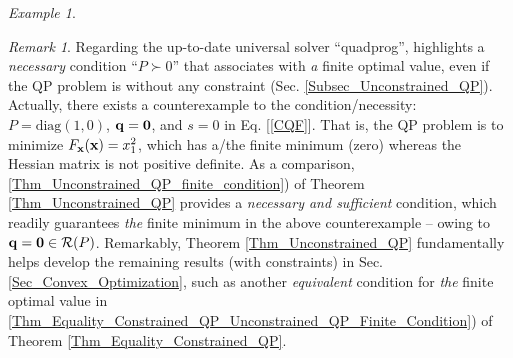 \documentclass[9pt,twocolumn,twoside,lineno]{pnas-new-1}
\newcommand{\bfx}{{\bf x}}
\newcommand{\bfq}{{\bf q}}
\newcommand{\bfzero}{{\bf 0}}
\newcommand{\calR}{{\mathcal R}}
\theoremstyle{remark}
\newtheorem{remark}{Remark}[section]
\newtheorem{example}{Example}[section]
\begin{document}
\begin{example}
\vspace{-0.4cm}\begin{remark}
Regarding the up-to-date universal solver ``quadprog'', \cite{MATLAB} highlights a \textit{necessary} condition ``$P\succ 0$'' that associates with \textit{a} finite optimal value, even if the QP problem is without any constraint (Sec. \ref{Subsec_Unconstrained_QP}). Actually, there exists a counterexample to the condition/necessity: $P=\mbox{diag}(1,0)$, $\bfq=\bfzero$, and $s=0$ in Eq. [\ref{CQF}]. That is, the QP problem is to minimize $F_\bfx(\bfx)=x_1^2$, which has a/the finite minimum (zero) whereas the Hessian matrix is not positive definite. As a comparison, \ref{Thm_Unconstrained_QP_finite_condition}) of Theorem \ref{Thm_Unconstrained_QP} provides a \textit{necessary and sufficient} condition, which readily guarantees \textit{the} finite minimum in the above counterexample -- owing to $\bfq=\bfzero\in\calR(P)$. Remarkably, Theorem \ref{Thm_Unconstrained_QP} fundamentally helps develop the remaining results (with constraints) in Sec. \ref{Sec_Convex_Optimization}, such as another \textit{equivalent} condition for \textit{the} finite optimal value in \ref{Thm_Equality_Constrained_QP_Unconstrained_QP_Finite_Condition}) of Theorem \ref{Thm_Equality_Constrained_QP}.
\end{remark}

\label{Ex_MATLAB}
\end{example}


\vspace{-0.5cm}
\end{document}
